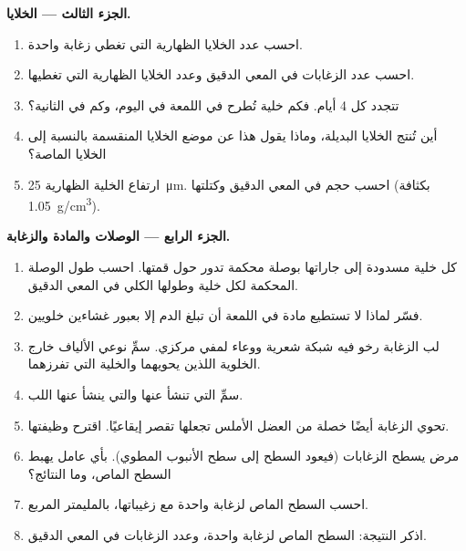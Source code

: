 \begin{problem}
\medskip
\noindent\textbf{الجزء الثالث --- الخلايا.}
\begin{enumerate}[resume]
  \item احسب عدد الخلايا الظهارية التي تغطي زغابة واحدة.
  \item احسب عدد الزغابات في المعي الدقيق وعدد الخلايا الظهارية التي
        تغطيها.
  \item تتجدد  كل \qty{4}{} أيام. فكم خلية تُطرح في اللمعة في
        اليوم، وكم في الثانية؟
  \item أين تُنتج الخلايا البديلة، وماذا يقول هذا عن موضع الخلايا
        المنقسمة بالنسبة إلى الخلايا الماصة؟
  \item ارتفاع الخلية الظهارية \qty{25}{\micro m}. احسب حجم 
        في المعي الدقيق وكتلتها (بكثافة \qty{1.05}{g/cm^3}).
\end{enumerate}

\medskip
\noindent\textbf{الجزء الرابع --- الوصلات والمادة والزغابة.}
\begin{enumerate}[resume]
  \item كل خلية مسدودة إلى جاراتها بوصلة محكمة تدور حول قمتها. احسب
        طول الوصلة المحكمة لكل خلية وطولها الكلي في المعي الدقيق.
  \item فسّر لماذا لا تستطيع مادة في اللمعة أن تبلغ الدم إلا بعبور
        غشاءين خلويين.
  \item لب الزغابة  رخو فيه شبكة شعرية ووعاء لمفي مركزي.
        سمِّ نوعي الألياف خارج الخلوية اللذين يحويهما والخلية التي
        تفرزهما.
  \item سمِّ  التي تنشأ عنها  والتي ينشأ عنها
        اللب.
  \item تحوي الزغابة أيضًا خصلة من العضل الأملس تجعلها تقصر إيقاعيًا.
        اقترح وظيفتها.
  \item مرض يسطح الزغابات (فيعود السطح إلى سطح الأنبوب المطوي). بأي
        عامل يهبط السطح الماص، وما النتائج؟
  \item احسب السطح الماص لزغابة واحدة مع زغيباتها، بالمليمتر المربع.
  \item اذكر النتيجة: السطح الماص لزغابة واحدة، وعدد الزغابات في
        المعي الدقيق.
\end{enumerate}
\end{problem}
